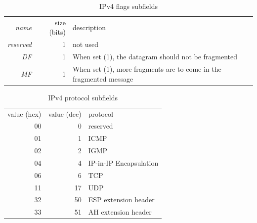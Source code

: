 \begin{table}
   \centering
   \begin{tabular}{rrl}
      \textit{name}     & size (bits) & description \\[1ex]
      \textit{reserved} & 1           & not used\\
      \textit{DF}       & 1           & When set (1), the datagram should not be fragmented\\
      \textit{MF}       & 1           & When set (1), more fragments are to come in the fragmented message\\
   \end{tabular}
   \caption{IPv4 flags subfields}
   \label{tab:ipv4-flags}
\end{table}


\begin{table}
   \centering
   \begin{tabular}{rrl}
      value (hex) & value (dec) & protocol\\[1ex]
      00 & 0 & reserved\\
      01 & 1 & ICMP\\
      02 & 2 & IGMP\\
      04 & 4 & IP-in-IP Encapsulation\\
      06 & 6 & TCP\\
      11 & 17 & UDP\\
      32 & 50 & ESP extension header\\
      33 & 51 & AH extension header\\
   \end{tabular}
   \caption{IPv4 protocol subfields}
   \label{tab:ipv4-protocols}
\end{table}





